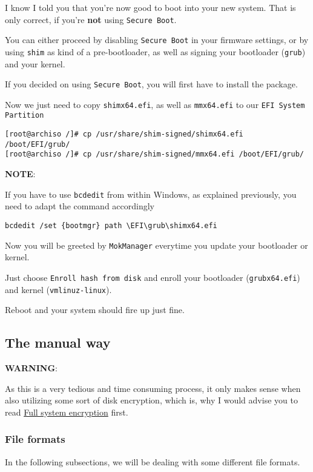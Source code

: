 \documentclass[9pt]{report}
\newcommand{\admonition}[2]{\textbf{#1}: {#2}}
\begin{document}
I know I told you that you’re now good to boot into your new system.
That is only correct, if you’re \textbf{not} using \texttt{Secure Boot}.


You can either proceed by disabling \texttt{Secure Boot} in your firmware settings, or by using \texttt{shim} as kind of a pre-bootloader, as well as signing your bootloader (\texttt{grub}) and your kernel.


If you decided on using \texttt{Secure Boot}, you will first have to install the package.


Now we just need to copy \texttt{shimx64.efi}, as well as \texttt{mmx64.efi} to our \texttt{EFI System Partition}


\begin{verbatim}
[root@archiso /]# cp /usr/share/shim-signed/shimx64.efi /boot/EFI/grub/
[root@archiso /]# cp /usr/share/shim-signed/mmx64.efi /boot/EFI/grub/
\end{verbatim}

\admonition{NOTE}{If you have to use \texttt{bcdedit} from within Windows, as explained previously, you need to adapt the command accordingly


}
\begin{verbatim}
bcdedit /set {bootmgr} path \EFI\grub\shimx64.efi
\end{verbatim}
Now you will be greeted by \texttt{MokManager} everytime you update your bootloader or kernel.


Just choose \texttt{Enroll hash from disk} and enroll your bootloader (\texttt{grubx64.efi}) and kernel (\texttt{vmlinuz-linux}).


Reboot and your system should fire up just fine.



\vfill\eject

\hypertarget{x-the-manual-way}{\subsection{The manual way}}
\admonition{WARNING}{As this is a very tedious and time consuming process, it only makes sense when also utilizing some sort of disk encryption, which is, why I would advise you to read \hyperlink{full-system-encryption}{Full system encryption} first.

}

\vfill\eject

\hypertarget{x-file-formats}{\subsubsection{File formats}}
In the following subsections, we will be dealing with some different file formats.
\end{document}
